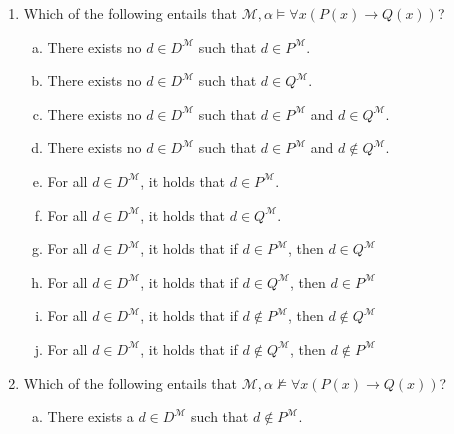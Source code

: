 \begin{enumerate}[\thesection.1]

\item Which of the following entails that $\mathcal{M},\alpha\vDash
  \forall x (P(x)\to Q(x))$?

  \begin{enumerate}[(a)]

  \item There exists no $d\in D^\mathcal{M}$ such that $d\in
  P^\mathcal{M}$.
    
  \item There exists no $d\in D^\mathcal{M}$ such that $d\in
    Q^\mathcal{M}$.
  
  \item There exists no $d\in D^\mathcal{M}$ such that $d\in
    P^\mathcal{M}$ and $d\in Q^\mathcal{M}$.

  \item There exists no $d\in D^\mathcal{M}$ such that $d\in
    P^\mathcal{M}$ and $d\notin Q^\mathcal{M}$.

   \item For all $d\in D^\mathcal{M}$, it holds that  $d\in
  P^\mathcal{M}$.

   \item For all $d\in D^\mathcal{M}$, it holds that  $d\in
  Q^\mathcal{M}$.
    
  \item For all $d\in D^\mathcal{M}$, it holds that if $d\in
    P^\mathcal{M}$, then $d\in Q^\mathcal{M}$

  \item For all $d\in D^\mathcal{M}$, it holds that if $d\in
    Q^\mathcal{M}$, then $d\in P^\mathcal{M}$
    
  \item For all $d\in D^\mathcal{M}$, it holds that if $d\notin
    P^\mathcal{M}$, then $d\notin Q^\mathcal{M}$

  \item For all $d\in D^\mathcal{M}$, it holds that if $d\notin
    Q^\mathcal{M}$, then $d\notin P^\mathcal{M}$
    
  \end{enumerate}

\item Which of the following entails that $\mathcal{M},\alpha\nvDash
  \forall x (P(x)\to Q(x))$?

  \begin{enumerate}[(a)]

  \item There exists a $d\in D^\mathcal{M}$ such that $d\notin
  P^\mathcal{M}$.
    

\end{enumerate}
\end{enumerate}
